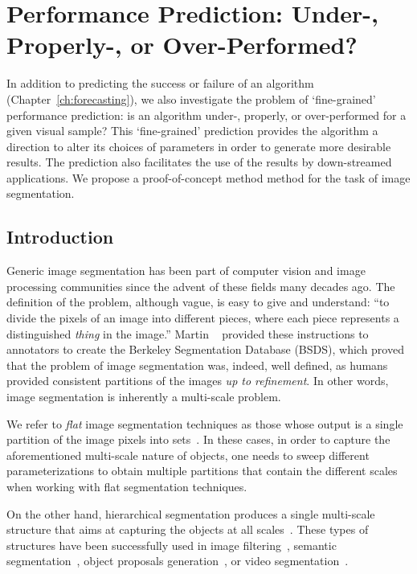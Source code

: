 \chapter{Performance Prediction: Under-, Properly-, or Over-Performed?}
\label{ch:scale-aware}

In addition to predicting the success or failure of an algorithm (Chapter~\ref{ch:forecasting}),  we also investigate the problem of `fine-grained' performance prediction: is an algorithm under-, properly, or over-performed for a given visual sample? This `fine-grained' prediction provides the algorithm a direction to alter its choices of parameters  in order to generate more desirable results. The prediction also facilitates the use of the results by down-streamed applications.  
We propose a proof-of-concept method method for the task of image segmentation.  

\section{Introduction}
\label{scale:sec:intro}
Generic image segmentation has been part of computer vision and image processing communities since the
advent of these fields many decades ago.
The definition of the problem, although vague, is easy to give and understand: ``to divide the pixels of an
image into different pieces, where each piece represents a distinguished \textit{thing}
in the image.''
Martin \etal~\citep{Martin-ICCV-2001 } provided these instructions to annotators to create
the Berkeley Segmentation Database (BSDS), which proved that the problem of image segmentation was,
indeed, well defined, as humans provided consistent partitions of the images \textit{up to refinement}.
In other words, image segmentation is inherently a multi-scale problem.

We refer to \textit{flat} image segmentation techniques as those whose output is a single partition of the
image pixels into sets~\citep{shi2000normalized,Comaniciu2002,felzenszwalb2004efficient}.
In these cases, in order to capture the aforementioned multi-scale nature of objects,
one needs to sweep different parameterizations to obtain multiple partitions that contain the
different scales when working with flat segmentation techniques.

On the other hand, hierarchical segmentation produces a single multi-scale structure that aims
at capturing the objects at all scales~\citep{arbelaez2011contour,kim2013learning,Salembier2000,Ren2013,MCG}. 
These types of structures have been successfully used in image filtering~\citep{Salembier2000},
semantic segmentation~\citep{Lempitsky2011}, object proposals generation~\citep{MCG},
or video segmentation~\citep{xu2013flattening,Varas2015}.

